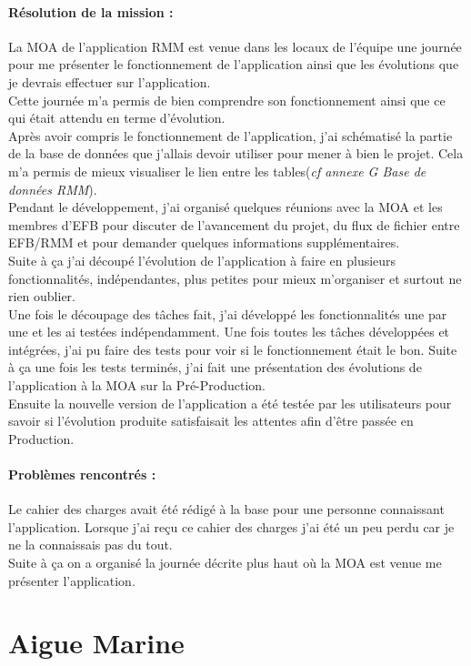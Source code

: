\documentclass[a4paper,twoside,12pt,openright]{report}
\begin{document}
\paragraph {Résolution de la mission :} 
La MOA de l'application RMM est venue dans les locaux de l'équipe une journée pour me présenter le fonctionnement de l'application ainsi que les évolutions que je devrais effectuer sur l'application.\\
Cette journée m'a permis de bien comprendre son fonctionnement ainsi que ce qui était attendu en terme d'évolution.\\
Après avoir compris le fonctionnement de l'application, j'ai schématisé la partie de la base de données que j'allais devoir utiliser pour mener à bien le projet. Cela m'a permis de mieux visualiser le lien entre les tables(\emph{cf annexe G Base de données RMM}).\\
Pendant le développement, j'ai organisé quelques réunions avec la MOA et les membres d'EFB pour discuter de l'avancement du projet, du flux de fichier entre EFB/RMM et pour demander quelques informations supplémentaires.\\
Suite à ça j'ai découpé l'évolution de l'application à faire en plusieurs fonctionnalités, indépendantes, plus petites pour mieux m'organiser et surtout ne rien oublier.\\
Une fois le découpage des tâches fait, j'ai développé les fonctionnalités une par une et les ai testées indépendamment. Une fois toutes les tâches développées et intégrées, j'ai pu faire des tests pour voir si le fonctionnement était le bon.
Suite à ça une fois les tests terminés, j'ai fait une présentation des évolutions de l'application à la MOA sur la Pré-Production.\\
Ensuite la nouvelle version de l'application a été testée par les utilisateurs pour savoir si l'évolution produite satisfaisait les attentes afin d'être passée en Production.
\paragraph {Problèmes rencontrés :}
Le cahier des charges avait été rédigé à la base pour une personne connaissant l'application. Lorsque j'ai reçu ce cahier des charges j'ai été un peu perdu car je ne la connaissais pas du tout.\\
Suite à ça on a organisé la journée décrite plus haut où la MOA est venue me présenter l'application.
\newpage
\section{Aigue Marine}
\vspace{1cm}
\end{document}
